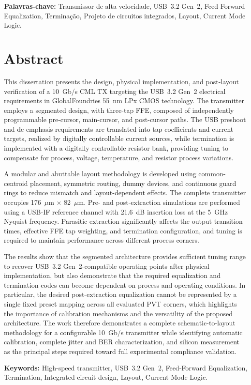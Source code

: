 \vspace{10mm}
\textbf{Palavras-chave:} Transmissor de alta velocidade, USB~3.2 Gen~2, Feed-Forward Equalization, Terminação, Projeto de circuitos integrados, Layout, Current Mode Logic.

\acresetall %

\chapter*{Abstract}
This dissertation presents the design, physical implementation, and post-layout verification of a 10~Gb/s \ac{CML} \ac{TX} targeting the USB~3.2 Gen~2 electrical requirements in GlobalFoundries 55~nm LPx CMOS technology. The transmitter employs a segmented design, with three-tap \ac{FFE}, composed of independently programmable pre-cursor, main-cursor, and post-cursor paths. The USB preshoot and de-emphasis requirements are translated into tap coefficients and current targets, realized by digitally controllable current sources, while termination is implemented with a digitally controllable resistor bank, providing tuning to compensate for process, voltage, temperature, and resistor process variations.

A modular and abuttable layout methodology is developed using common-centroid placement, symmetric routing, dummy devices, and continuous guard rings to reduce mismatch and layout-dependent effects. The complete transmitter occupies 176~$\mu$m $\times$ 82~$\mu$m. Pre- and post-extraction simulations are performed using a USB-IF reference channel with 21.6~dB insertion loss at the 5~GHz Nyquist frequency. Parasitic extraction significantly affects the output transition times, effective FFE tap weighting, and termination configuration, and tuning is required to maintain performance across different process corners.

The results show that the segmented architecture provides sufficient tuning range to recover USB~3.2 Gen~2-compatible operating points after physical implementation, but also demonstrate that the required equalization and termination codes can become dependent on process and operating conditions. %
In particular, the desired post-extraction equalization cannot be represented by a single fixed preset mapping across all evaluated PVT corners, which highlights the importance of calibration mechanisms and the versatility of the proposed architecture. The work therefore demonstrates a complete schematic-to-layout methodology for a configurable 10~Gb/s transmitter while identifying automatic calibration, complete jitter and BER characterization, and silicon measurement as the principal steps required toward full experimental compliance validation.

\vspace{10mm}
\textbf{Keywords:} High-speed transmitter, USB~3.2 Gen~2, Feed-Forward Equalization, Termination, Integrated-circuit design, Layout, Current-Mode Logic.

\acresetall %
